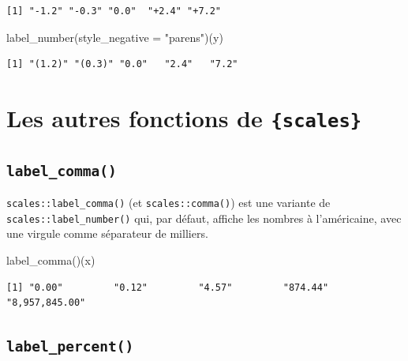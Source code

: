 \documentclass[
  letterpaper,
  DIV=11,
  numbers=noendperiod,
  oneside]{scrreprt}
\newenvironment{Shaded}{\begin{snugshade}}{\end{snugshade}}
\newcommand{\AttributeTok}[1]{\textcolor[rgb]{0.40,0.45,0.13}{#1}}
\newcommand{\FunctionTok}[1]{\textcolor[rgb]{0.28,0.35,0.67}{#1}}
\newcommand{\NormalTok}[1]{\textcolor[rgb]{0.00,0.23,0.31}{#1}}
\newcommand{\StringTok}[1]{\textcolor[rgb]{0.13,0.47,0.30}{#1}}
\begin{document}
\begin{verbatim}
[1] "-1.2" "-0.3" "0.0"  "+2.4" "+7.2"
\end{verbatim}

\begin{Shaded}
\begin{Highlighting}[]
\FunctionTok{label\_number}\NormalTok{(}\AttributeTok{style\_negative =} \StringTok{"parens"}\NormalTok{)(y)}
\end{Highlighting}
\end{Shaded}

\begin{verbatim}
[1] "(1.2)" "(0.3)" "0.0"   "2.4"   "7.2"  
\end{verbatim}

\hypertarget{les-autres-fonctions-de-scales}{%
\section{\texorpdfstring{Les autres fonctions de
\texttt{\{scales\}}}{Les autres fonctions de \{scales\}}}\label{les-autres-fonctions-de-scales}}

\hypertarget{label_comma}{%
\subsection{\texorpdfstring{\texttt{label\_comma()}}{label\_comma()}}\label{label_comma}}

\texttt{scales::label\_comma()} (et \texttt{scales::comma()}) est une
variante de \texttt{scales::label\_number()} qui, par défaut, affiche
les nombres à l'américaine, avec une virgule comme séparateur de
milliers.

\begin{Shaded}
\begin{Highlighting}[]
\FunctionTok{label\_comma}\NormalTok{()(x)}
\end{Highlighting}
\end{Shaded}

\begin{verbatim}
[1] "0.00"         "0.12"         "4.57"         "874.44"       "8,957,845.00"
\end{verbatim}

\hypertarget{label_percent}{%
\subsection{\texorpdfstring{\texttt{label\_percent()}}{label\_percent()}}\label{label_percent}}
\end{document}
